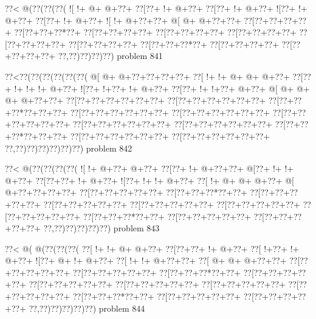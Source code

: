 \vbox{\vbox{\goo
\0??<\- @(\0??(\0??(\0??(
\- ![\- !+\- @+\- @+\0??+
\0??[\0??+\- !+\- @+\0??+
\0??[\0??+\- !+\- @+\0??+
\- ![\0??+\- !+\- @+\0??+
\0??[\0??+\- !+\- @+\0??+
\- ![\- !+\- @+\0??+\0??+
\- @[\- @+\- @+\0??+\0??+
\0??[\0??+\0??+\0??+\0??+
\0??[\0??+\0??+\0??*\0??+
\0??[\0??+\0??+\0??+\0??+
\0??[\0??+\0??+\0??+\0??+
\0??[\0??+\0??+\0??+\0??+
\0??[\0??+\0??+\0??+\0??+
\0??[\0??+\0??+\0??+\0??+
\0??[\0??+\0??+\0??*\0??+
\0??[\0??+\0??+\0??+\0??+
\0??[\0??+\0??+\0??+\0??+
\0??,\0??)\0??)\0??)\0??)
}
\hfil problem 841\hfil\break
}

\vbox{\vbox{\goo
\0??<\0??(\0??(\0??(\0??(\0??(\0??(
\- @[\- @+\- @+\0??+\0??+\0??+\0??+
\0??[\- !+\- !+\- @+\- @+\- @+\0??+
\0??[\0??+\- !+\- !+\- !+\- @+\0??+
\- ![\0??+\- !+\0??+\- !+\- @+\0??+
\0??[\0??+\- !+\- !+\0??+\- @+\0??+
\- @[\- @+\- @+\- @+\- @+\0??+\0??+
\0??[\0??+\0??+\0??+\0??+\0??+\0??+
\0??[\0??+\0??+\0??+\0??+\0??+\0??+
\0??[\0??+\0??+\0??*\0??+\0??+\0??+
\0??[\0??+\0??+\0??+\0??+\0??+\0??+
\0??[\0??+\0??+\0??+\0??+\0??+\0??+
\0??[\0??+\0??+\0??+\0??+\0??+\0??+
\0??[\0??+\0??+\0??+\0??+\0??+\0??+
\0??[\0??+\0??+\0??+\0??+\0??+\0??+
\0??[\0??+\0??+\0??*\0??+\0??+\0??+
\0??[\0??+\0??+\0??+\0??+\0??+\0??+
\0??[\0??+\0??+\0??+\0??+\0??+\0??+
\0??,\0??)\0??)\0??)\0??)\0??)\0??)
}
\hfil problem 842\hfil\break
}

\vbox{\vbox{\goo
\0??<\- @(\0??(\0??(\0??(\0??(
\- ![\- !+\- @+\0??+\- @+\0??+
\0??[\0??+\- !+\- @+\0??+\0??+
\- @[\0??+\- !+\- !+\- @+\0??+
\0??[\0??+\0??+\- !+\- @+\0??+
\- ![\0??+\- !+\- !+\- @+\0??+
\0??[\- !+\- @+\- @+\- @+\0??+
\- @[\- @+\0??+\0??+\0??+\0??+
\0??[\0??+\0??+\0??+\0??+\0??+
\0??[\0??+\0??+\0??*\0??+\0??+
\0??[\0??+\0??+\0??+\0??+\0??+
\0??[\0??+\0??+\0??+\0??+\0??+
\0??[\0??+\0??+\0??+\0??+\0??+
\0??[\0??+\0??+\0??+\0??+\0??+
\0??[\0??+\0??+\0??+\0??+\0??+
\0??[\0??+\0??+\0??*\0??+\0??+
\0??[\0??+\0??+\0??+\0??+\0??+
\0??[\0??+\0??+\0??+\0??+\0??+
\0??,\0??)\0??)\0??)\0??)\0??)
}
\hfil problem 843\hfil\break
}

\vbox{\vbox{\goo
\0??<\- @(\- @(\0??(\0??(\0??(
\0??[\- !+\- !+\- @+\- @+\0??+
\0??[\0??+\0??+\- !+\- @+\0??+
\0??[\- !+\0??+\- !+\- @+\0??+
\- ![\0??+\- @+\- !+\- @+\0??+
\0??[\- !+\- !+\- @+\0??+\0??+
\0??[\- @+\- @+\- @+\0??+\0??+
\0??[\0??+\0??+\0??+\0??+\0??+
\0??[\0??+\0??+\0??+\0??+\0??+
\0??[\0??+\0??+\0??*\0??+\0??+
\0??[\0??+\0??+\0??+\0??+\0??+
\0??[\0??+\0??+\0??+\0??+\0??+
\0??[\0??+\0??+\0??+\0??+\0??+
\0??[\0??+\0??+\0??+\0??+\0??+
\0??[\0??+\0??+\0??+\0??+\0??+
\0??[\0??+\0??+\0??*\0??+\0??+
\0??[\0??+\0??+\0??+\0??+\0??+
\0??[\0??+\0??+\0??+\0??+\0??+
\0??,\0??)\0??)\0??)\0??)\0??)
}
\hfil problem 844\hfil\break
}

